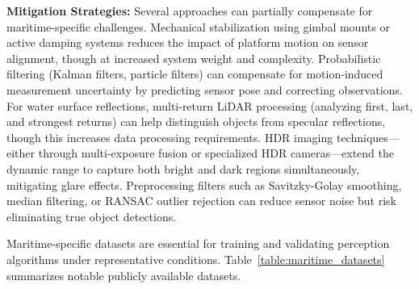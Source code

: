 \documentclass{erauthesis}
\begin{document}
\textbf{Mitigation Strategies:} Several approaches can partially compensate for maritime-specific challenges. Mechanical stabilization using gimbal mounts or active damping systems reduces the impact of platform motion on sensor alignment, though at increased system weight and complexity. Probabilistic filtering (Kalman filters, particle filters) can compensate for motion-induced measurement uncertainty by predicting sensor pose and correcting observations. For water surface reflections, multi-return LiDAR processing (analyzing first, last, and strongest returns) can help distinguish objects from specular reflections, though this increases data processing requirements. HDR imaging techniques—either through multi-exposure fusion or specialized HDR cameras—extend the dynamic range to capture both bright and dark regions simultaneously, mitigating glare effects. Preprocessing filters such as Savitzky-Golay smoothing, median filtering, or RANSAC outlier rejection can reduce sensor noise but risk eliminating true object detections.

Maritime-specific datasets are essential for training and validating perception algorithms under representative conditions. Table~\ref{table:maritime_datasets} summarizes notable publicly available datasets.
\end{document}
